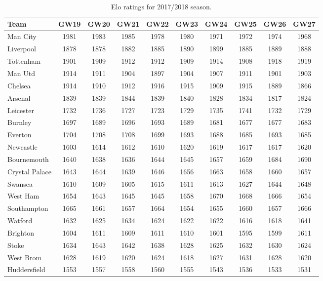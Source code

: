 \begin{table}[H]
\centering
\smaller
\begin{tabular}{|l|c|c|c|c|c|c|c|c|c|}
\hline
Team           & GW19 & GW20 & GW21 & GW22 & GW23 & GW24 & GW25 & GW26 & GW27 \\
\hline
Man City       & 1981 & 1983 & 1985 & 1978 & 1980 & 1971 & 1972 & 1974 & 1968 \\
Liverpool      & 1878 & 1878 & 1882 & 1885 & 1890 & 1899 & 1885 & 1889 & 1888 \\
Tottenham      & 1901 & 1909 & 1912 & 1912 & 1909 & 1914 & 1908 & 1918 & 1919 \\
Man Utd        & 1914 & 1911 & 1904 & 1897 & 1904 & 1907 & 1911 & 1901 & 1903 \\
Chelsea        & 1914 & 1910 & 1912 & 1916 & 1915 & 1909 & 1915 & 1889 & 1866 \\
Arsenal        & 1839 & 1839 & 1844 & 1839 & 1840 & 1828 & 1834 & 1817 & 1824 \\
Leicester      & 1732 & 1736 & 1727 & 1723 & 1729 & 1735 & 1741 & 1732 & 1729 \\
Burnley        & 1697 & 1689 & 1696 & 1693 & 1689 & 1681 & 1677 & 1677 & 1683 \\
Everton        & 1704 & 1708 & 1708 & 1699 & 1693 & 1688 & 1685 & 1693 & 1685 \\
Newcastle      & 1603 & 1614 & 1612 & 1610 & 1620 & 1619 & 1617 & 1617 & 1620 \\
Bournemouth    & 1640 & 1638 & 1636 & 1644 & 1645 & 1657 & 1659 & 1684 & 1690 \\
Crystal Palace & 1643 & 1644 & 1639 & 1646 & 1656 & 1663 & 1658 & 1660 & 1657 \\
Swansea        & 1610 & 1609 & 1605 & 1615 & 1611 & 1613 & 1627 & 1644 & 1648 \\
West Ham       & 1654 & 1643 & 1645 & 1645 & 1658 & 1670 & 1668 & 1666 & 1654 \\
Southampton    & 1665 & 1661 & 1657 & 1664 & 1654 & 1655 & 1660 & 1657 & 1666 \\
Watford        & 1632 & 1625 & 1634 & 1624 & 1622 & 1622 & 1616 & 1618 & 1641 \\
Brighton       & 1604 & 1611 & 1609 & 1611 & 1610 & 1601 & 1595 & 1599 & 1611 \\
Stoke          & 1634 & 1643 & 1642 & 1638 & 1628 & 1625 & 1632 & 1630 & 1624 \\
West Brom      & 1628 & 1619 & 1620 & 1624 & 1618 & 1627 & 1631 & 1628 & 1620 \\
Huddersfield   & 1553 & 1557 & 1558 & 1560 & 1555 & 1543 & 1536 & 1533 & 1531 \\
\hline
\end{tabular}
\caption{Elo ratings for 2017/2018 season.}
\label{tab:elo_values_gameweeks_3}
\end{table}


